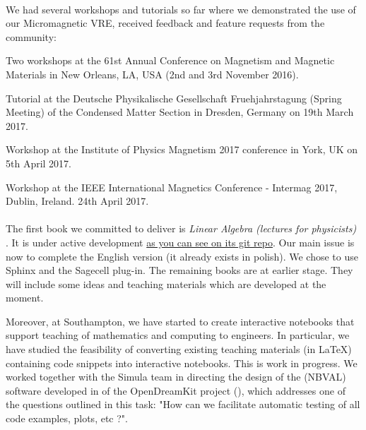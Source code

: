\documentclass{deliverablereport}
\begin{document}
\paragraph{}
\label{dissem@dissemination-of-oommf-nb-workshops}

We had several workshops and tutorials so far where we demonstrated the use of our Micromagnetic VRE, received feedback and feature requests from the community:

\begin{compactitem}
\item Two workshops at the 61st Annual Conference on Magnetism and Magnetic Materials in New Orleans,
    LA, USA (2nd and 3rd November 2016).
\item Tutorial at the Deutsche Physikalische Gesellschaft Fruehjahrstagung (Spring Meeting) of the Condensed Matter Section in Dresden, Germany on 19th March 2017.
\item Workshop at the Institute of Physics Magnetism 2017 conference in York, UK on 5th April 2017.
\item Workshop at the IEEE International Magnetics Conference - Intermag 2017, Dublin, Ireland. 24th April 2017.
\end{compactitem}

\paragraph{}


The first book we committed to deliver is \emph{Linear Algebra (lectures for physicists)} . It is under active development \href{https://github.com/Hadriamit/iODKbook2}{as you can see on its git repo}. Our main issue is now to complete the English version (it already exists in polish). We chose to use Sphinx and the Sagecell plug-in. The remaining books are at earlier stage. They will include some ideas and teaching materials which are developed at the moment.

Moreover, at Southampton, we have started to create interactive notebooks that support teaching of mathematics and computing to engineers. In particular, we have studied the feasibility of converting existing teaching materials (in LaTeX) containing code snippets into interactive notebooks. This is work in progress. We worked together with the Simula team in directing the design of the (NBVAL) software developed in  of the OpenDreamKit project (), which addresses one of the questions outlined in this task: "How can we facilitate automatic testing of all code examples, plots, etc ?".
\end{document}
